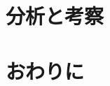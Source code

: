 \documentclass[submit,techrep,noauthor]{ipsj}
\begin{document}
\section{分析と考察}


\section{おわりに}


\end{document}
